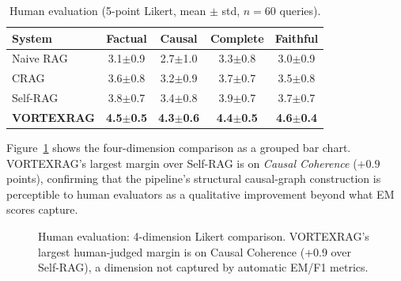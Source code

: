 \documentclass[10pt,twocolumn]{article}
\begin{document}
\begin{table}[h]
\centering
\caption{Human evaluation (5-point Likert, mean $\pm$ std, $n=60$ queries).}
\label{tab:human_eval}
\footnotesize
\setlength{\tabcolsep}{3.2pt}
\begin{tabular}{@{}lcccc@{}}
\toprule
\textbf{System} & \textbf{Factual} & \textbf{Causal} & \textbf{Complete} & \textbf{Faithful} \\
\midrule
Naive RAG  & 3.1$\pm$0.9 & 2.7$\pm$1.0 & 3.3$\pm$0.8 & 3.0$\pm$0.9 \\
CRAG       & 3.6$\pm$0.8 & 3.2$\pm$0.9 & 3.7$\pm$0.7 & 3.5$\pm$0.8 \\
Self-RAG   & 3.8$\pm$0.7 & 3.4$\pm$0.8 & 3.9$\pm$0.7 & 3.7$\pm$0.7 \\
\textbf{VORTEXRAG}  & \textbf{4.5$\pm$0.5} & \textbf{4.3$\pm$0.6} & \textbf{4.4$\pm$0.5} & \textbf{4.6$\pm$0.4} \\
\bottomrule
\end{tabular}
\end{table}

Figure~\ref{fig:human_radar_bar} shows the four-dimension comparison as a
grouped bar chart.  VORTEXRAG's largest margin over Self-RAG is on
\emph{Causal Coherence} ($+0.9$ points), confirming that the pipeline's
structural causal-graph construction is perceptible to human evaluators as
a qualitative improvement beyond what EM scores capture.

\begin{figure}[h]
\centering
{}
\caption{Human evaluation: 4-dimension Likert comparison.  VORTEXRAG's
largest human-judged margin is on Causal Coherence ($+$0.9 over Self-RAG),
a dimension not captured by automatic EM/F1 metrics.}
\label{fig:human_radar_bar}
\end{figure}
\end{document}
